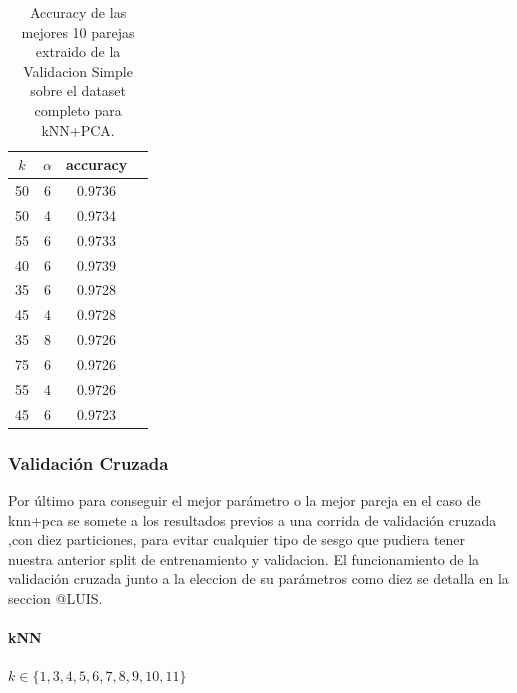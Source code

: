 \begin{table}[h!]
    \begin{center}
        \begin{tabular}{|c|c|c|c|}
        \hline
        \textbf{$k$} & \textbf{$\alpha$} & \textbf{accuracy} \\
        \hline
        50 & 6 & 0.9736\\
        50 & 4 & 0.9734\\
        55 & 6 & 0.9733\\
        40 & 6 & 0.9739\\
        35 & 6 & 0.9728\\
        45 & 4 & 0.9728\\
        35 & 8 & 0.9726\\
        75 & 6 & 0.9726\\
        55 & 4 & 0.9726\\
        45 & 6 & 0.9723\\
        
        \hline
        \end{tabular}
        \caption{Accuracy de las mejores 10 parejas extraido de la Validacion Simple sobre el dataset completo para kNN+PCA.}
        \label{knnpca_valSimple_table}
    \end{center}
\end{table}

\subsubsection{Validación Cruzada}

Por último para conseguir el mejor parámetro o la mejor pareja en el caso de knn+pca se somete a los resultados previos a una corrida de validación cruzada ,con diez particiones, para evitar cualquier tipo de sesgo que pudiera tener nuestra anterior split de entrenamiento y validacion. 
El funcionamiento de la validación cruzada junto a la eleccion de su parámetros como diez se detalla en la seccion @LUIS.

\paragraph{kNN}


$ k \in \{1,3,4,5,6,7,8,9,10,11\}$

